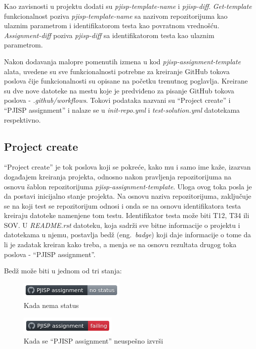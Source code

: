 \documentclass[12pt]{report}
\begin{document}
Kao zavisnosti u projektu dodati su \textit{pjisp-template-name} i \textit{pjisp-diff}. \textit{Get-template} funkcionalnost poziva \textit{pjisp-template-name} sa nazivom repozitorijuma kao ulaznim parametrom i identifikatorom testa kao povratnom vrednošću. \textit{Assignment-diff} poziva \textit{pjisp-diff} sa identifikatorom testa kao ulaznim parametrom.

Nakon dodavanja malopre pomenutih izmena u kod \textit{pjisp-assignment-template} alata, uvedene su sve funkcionalnosti potrebne za kreiranje GitHub tokova poslova čije funkcionalnosti su opisane na početku trenutnog poglavlja. Kreirane su dve nove datoteke na mestu koje je predviđeno za pisanje GitHub tokova poslova - \textit{.github/workflows}. Tokovi podataka nazvani su ``Project create'' i ``PJISP assignment'' i nalaze se u \textit{init-repo.yml} i \textit{test-solution.yml} datotekama respektivno.

\subsection{Project create}
``Project create'' je tok poslova koji se pokreće, kako mu i samo ime kaže, izazvan događajem kreiranja projekta, odnosno nakon pravljenja repozitorijuma na osnovu šablon repozitorijuma \textit{pjisp-assignment-template}. Uloga ovog toka posla je da postavi inicijalno stanje projekta. Na osnovu naziva repozitorijuma, zaključuje se na koji test se repozitorijum odnosi i onda se na osnovu identifikatora testa kreiraju datoteke namenjene tom testu. Identifikator testa može biti T12, T34 ili SOV. U \textit{README.rst} datoteku, koja sadrži sve bitne informacije o projektu i datotekama u njemu, postavlja bedž (eng.\ \textit{badge}) koji daje informacije o tome da li je zadatak kreiran kako treba, a menja se na osnovu rezultata drugog toka poslova - ``PJISP assignment''.

Bedž može biti u jednom od tri stanja:

\begin{figure}[H]
    \centering
    \includegraphics{images/nostatus.png}
    \caption{Kada nema status}
\end{figure}

\begin{figure}[H]
    \centering
    \includegraphics{images/failing.png}
    \caption{Kada se ``PJISP assignment'' neuspešno izvrši}
\end{figure}
\end{document}
